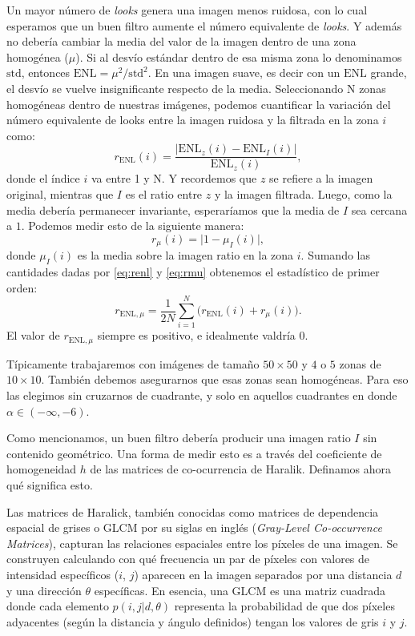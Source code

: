 Un mayor número de \emph{looks} genera una imagen menos ruidosa, con lo cual esperamos que un buen filtro aumente el número equivalente de \emph{looks}. Y además no debería cambiar la media del valor de la imagen dentro de una zona homogénea ($\mu$). Si al desvío estándar dentro de esa misma zona lo denominamos $\text{std}$, entonces $\text{ENL} = \mu^2 / \text{std}^2$. En una imagen suave, es decir con un $\text{ENL}$ grande, el desvío se vuelve insignificante respecto de la media. Seleccionando N zonas homogéneas dentro de nuestras imágenes, podemos cuantificar la variación del número equivalente de looks entre la imagen ruidosa y la filtrada en la zona $i$ como:
\begin{equation}\label{eq:renl}
    r_{\text{ENL}}(i) = \frac{\big|\text{ENL}_z(i) - \text{ENL}_I(i)\big|}{\text{ENL}_z(i)},
\end{equation}
donde el índice $i$ va entre 1 y N. Y recordemos que $z$ se refiere a la imagen original, mientras que $I$ es el ratio entre $z$ y la imagen filtrada. Luego, como la media debería permanecer invariante, esperaríamos que la media de $I$ sea cercana a $1$. Podemos medir esto de la siguiente manera:
\begin{equation}\label{eq:rmu}
    r_{\mu}(i) = \big|1-\mu_I(i)\big|,
\end{equation}
donde $\mu_I(i)$ es la media sobre la imagen ratio en la zona $i$. Sumando las cantidades dadas por \ref{eq:renl} y \ref{eq:rmu} obtenemos el estadístico de primer orden:
\begin{equation}
    r_{\text{ENL},\mu} = \frac{1}{2N}\sum_{i=1}^{N} \big( r_{\text{ENL}}(i) + r_{\mu}(i) \big).
\end{equation}
El valor de $r_{\text{ENL},\mu}$ siempre es positivo, e idealmente valdría $0$.

Típicamente trabajaremos con imágenes de tamaño $50\times50$ y $4$ o $5$ zonas de $10\times10$. También debemos asegurarnos que esas zonas sean homogéneas. Para eso las elegimos sin cruzarnos de cuadrante, y solo en aquellos cuadrantes en donde $\alpha\in(-\infty,-6)$.

Como mencionamos, un buen filtro debería producir una imagen ratio $I$ sin contenido geométrico. Una forma de medir esto es a través del coeficiente de homogeneidad $h$ de las matrices de co-ocurrencia de Haralik. Definamos ahora qué significa esto.

Las matrices de Haralick, también conocidas como matrices de dependencia espacial de grises o GLCM por su siglas en inglés (\emph{Gray-Level Co-occurrence Matrices}), capturan las relaciones espaciales entre los píxeles de una imagen. Se construyen calculando con qué frecuencia un par de píxeles con valores de intensidad específicos ($i$, $j$) aparecen en la imagen separados por una distancia $d$ y una dirección $\theta$ específicas. En esencia, una GLCM es una matriz cuadrada donde cada elemento $p(i, j | d, \theta)$ representa la probabilidad de que dos píxeles adyacentes (según la distancia y ángulo definidos) tengan los valores de gris $i$ y $j$.

